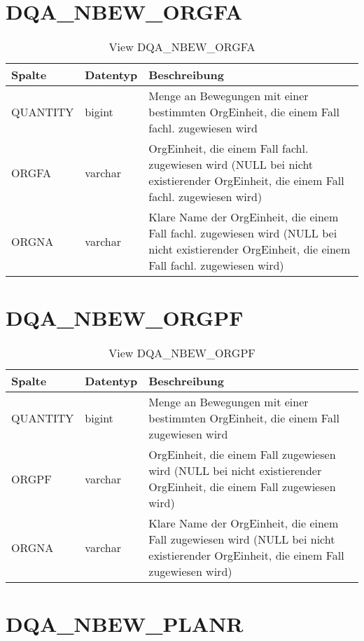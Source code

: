   \section{DQA\_NBEW\_ORGFA}

  \begin{table}[ht]
    \centering
    \caption{View DQA\_NBEW\_ORGFA}
    \label{tab:dqanbeworgfa}
    \begin{tabular}{||l|l|p{10cm}||}
      \hline
      Spalte & Datentyp & Beschreibung \\ [0.5ex] \hline \hline
QUANTITY & bigint & Menge an Bewegungen mit einer bestimmten OrgEinheit, die einem Fall fachl. zugewiesen wird \\ \hline
ORGFA & varchar & OrgEinheit, die einem Fall fachl. zugewiesen wird (NULL bei nicht existierender OrgEinheit, die einem Fall fachl. zugewiesen wird)\\ \hline
ORGNA & varchar & Klare Name der OrgEinheit, die einem Fall fachl. zugewiesen wird (NULL bei nicht existierender OrgEinheit, die einem Fall fachl. zugewiesen wird)\\ \hline
    \end{tabular}
  \end{table}
 \clearpage
  \section{DQA\_NBEW\_ORGPF}

  \begin{table}[ht]
    \centering
    \caption{View DQA\_NBEW\_ORGPF}
    \label{tab:dqanbeworgpf}
    \begin{tabular}{||l|l|p{10cm}||}
      \hline
      Spalte & Datentyp & Beschreibung \\ [0.5ex] \hline \hline
QUANTITY & bigint & Menge an Bewegungen mit einer bestimmten OrgEinheit, die einem Fall zugewiesen wird \\ \hline
ORGPF & varchar & OrgEinheit, die einem Fall zugewiesen wird (NULL bei nicht existierender OrgEinheit, die einem Fall zugewiesen wird)\\ \hline
ORGNA & varchar & Klare Name der OrgEinheit, die einem Fall zugewiesen wird (NULL bei nicht existierender OrgEinheit, die einem Fall zugewiesen wird)\\ \hline
    \end{tabular}
  \end{table}
 
  \section{DQA\_NBEW\_PLANR}

